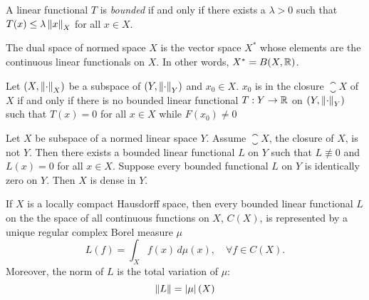 A linear functional $T$ is \textit{bounded} if and only if there exists a $\lambda >
0$ such that $T(x) \leq \lambda \left\| x \right\|_{X}$ for all $x \in X$.

\begin{definition}
   The dual space of normed space $X$ is the vector space $X^*$ whose elements
   are the continuous linear functionals on $X$. In other words, $X^* = B(X,
   \mathbb{R})$.
\end{definition}

\begin{theorem}
   \label{thm:hahn_banach_1}
   Let $(X, \left\| \cdot \right\|_{X})$ be a subspace of $(Y, \left\| \cdot \right\|_{Y})$ and $x_0
   \in X$. $x_0$ is in the closure $\closure{X}$ of $X$ if and only if there is
   no bounded linear functional $T: Y \to \mathbb{R}$ on $(Y, \left\| \cdot \right\|_{Y})$ such
   that $T(x) = 0$ for all $x \in X$ while $F(x_0) \not= 0$
\end{theorem}


\begin{corollary}
   \label{thm:hahn_banach_2}
   Let $X$ be subspace of a normed linear space $Y$. Assume $\closure{X}$, the
   closure of $X$, is not $Y$. Then there exists a bounded linear functional $L$
   on $Y$ such that $L \not\equiv 0$ and $L(x) = 0$ for all $x \in X$. Suppose
   every bounded functional $L$ on $Y$ is identically zero on $Y$. Then $X$ is
   dense in $Y$.
\end{corollary}

\begin{theorem}
   \cite[Theorem 6.19, p. 130]{rudinRealComplexAnalysis1987}
   \label{thm:riesz_rep}

   If $X$ is a locally compact Hausdorff space, then every bounded linear
   functional $L$ on the the space of all continuous functions on $X$, $C(X)$,
   is represented by a unique regular complex Borel measure $\mu$
   \begin{equation*}
      L(f) = \int_{X} f(x) \,d\mu(x), \quad \forall f \in C(X).
   \end{equation*}
   Moreover, the norm of $L$ is the total variation of $\mu$:
   \begin{equation}
      \left\| L \right\| = \left| \mu \right|(X)
   \end{equation}
\end{theorem}

